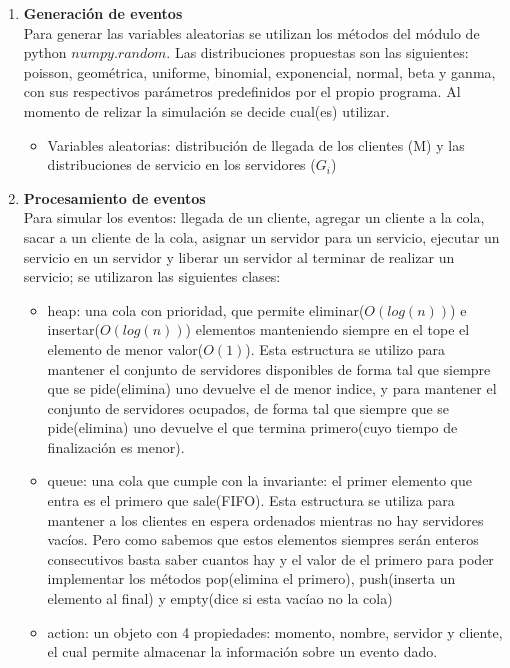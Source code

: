\documentclass[article]{amsart}
\begin{document}
\begin{enumerate}
\item \textbf{Generaci\'on de eventos}\\
Para generar las variables aleatorias se utilizan los m\'etodos del m\'odulo de python $numpy.random$. Las distribuciones propuestas son las siguientes: poisson, geom\'etrica, uniforme, binomial, exponencial, normal, beta y ganma, con sus respectivos par\'ametros predefinidos por el propio programa. Al momento de relizar la simulaci\'on se decide cual(es) utilizar.\\
\begin{itemize}
\item Variables aleatorias: distribución de llegada de los clientes (M) y las distribuciones de servicio en los servidores ($G_{i}$)\\
\end{itemize}
\item \textbf{Procesamiento de eventos}\\
Para simular los eventos: llegada de un cliente, agregar un cliente a la cola, sacar a un cliente de la cola, asignar un servidor para un servicio, ejecutar un servicio en un servidor y liberar un servidor al terminar de realizar un servicio; se utilizaron las siguientes clases: \\
\begin{itemize}
\item heap: una cola con prioridad, que permite eliminar($O(log(n))$) e insertar($O(log(n))$) elementos manteniendo siempre en el tope el elemento de menor valor($O(1)$). Esta estructura se utilizo para mantener el conjunto de servidores disponibles de forma tal que siempre que se pide(elimina) uno devuelve el de menor indice, y para mantener el conjunto de servidores ocupados, de forma tal que siempre que se pide(elimina) uno devuelve el que termina primero(cuyo tiempo de finalizaci\'on es menor). \\
\item queue: una cola que cumple con la invariante: el primer elemento que entra es el primero que sale(FIFO). Esta estructura se utiliza para mantener a los clientes en espera ordenados mientras no hay servidores vac\'ios. Pero como sabemos que estos elementos siempres ser\'an enteros consecutivos basta saber cuantos hay y el valor de el primero para poder implementar los m\'etodos pop(elimina el primero), push(inserta un elemento al final) y empty(dice si esta vac\'iao no la cola)\\
\item action: un objeto con 4 propiedades: momento, nombre, servidor y cliente, el cual permite almacenar la informaci\'on sobre un evento dado.\\

\end{itemize}
\end{enumerate}
\end{document}
